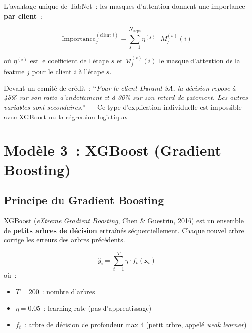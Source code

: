 \documentclass[12pt,a4paper]{article}
\begin{document}
L'avantage unique de TabNet~: les masques d'attention donnent une importance \textbf{par client}~:

$$\text{Importance}_j^{(\text{client}\;i)} = \sum_{s=1}^{N_{\text{steps}}} \eta^{(s)} \cdot M_{j}^{(s)}(i)$$

o\`u $\eta^{(s)}$ est le coefficient de l'\'etape $s$ et $M_{j}^{(s)}(i)$ le masque d'attention de la feature $j$ pour le client $i$ \`a l'\'etape $s$.

\begin{interpretbox}
Devant un comit\'e de cr\'edit~: ``\textit{Pour le client Durand SA, la d\'ecision repose \`a 45\% sur son ratio d'endettement et \`a 30\% sur son retard de paiement. Les autres variables sont secondaires.}'' --- Ce type d'explication individuelle est impossible avec XGBoost ou la r\'egression logistique.
\end{interpretbox}


\section{Mod\`ele 3~: XGBoost (Gradient Boosting)}
\label{sec:xgboost}

\subsection{Principe du Gradient Boosting}

XGBoost (\textit{eXtreme Gradient Boosting}, Chen \& Guestrin, 2016) est un ensemble de \textbf{petits arbres de d\'ecision} entra\^in\'es s\'equentiellement. Chaque nouvel arbre corrige les erreurs des arbres pr\'ec\'edents.

\begin{formulebox}
\begin{equation}
    \hat{y}_i = \sum_{t=1}^{T} \eta \cdot f_t(\mathbf{x}_i)
    \label{eq:xgb}
\end{equation}
o\`u~:
\begin{itemize}[noitemsep]
    \item $T = 200$~: nombre d'arbres
    \item $\eta = 0.05$~: learning rate (pas d'apprentissage)
    \item $f_t$~: arbre de d\'ecision de profondeur max 4 (petit arbre, appel\'e \textit{weak learner})
\end{itemize}
\end{formulebox}
\end{document}
